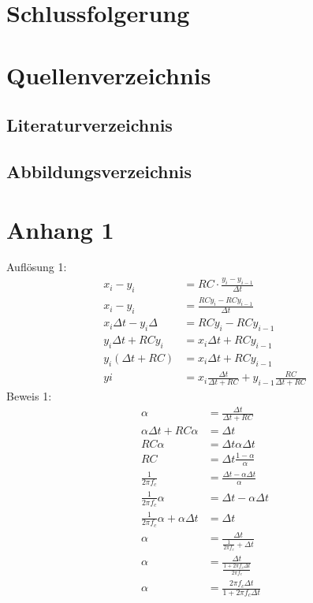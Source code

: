 \documentclass[12pt,a4paper, ngerman]{article}
\begin{document}
\section{Schlussfolgerung}

\newpage
\section{Quellenverzeichnis}
\subsection{Literaturverzeichnis}
\printbibliography
\subsection{Abbildungsverzeichnis}
\listoffigures
\newpage
\section{Anhang 1}
Auflösung 1:
\begin{align*} 
x_{i}-y_{i}&=RC\cdot \frac{y_{i}-y_{i-1}}{\Delta t} \\ 
x_{i}-y_{i}&=\frac{RCy_{i}-RCy_{i-1}}{\Delta t}\\
x_{i}\Delta t-y_{i}\Delta&=RCy_{i}-RCy_{i-1} \\
y_{i}\Delta t+RCy_{i}&=x_{i}\Delta t+RCy_{i-1} \\
y_{i}(\Delta t+RC)&=x_{i}\Delta t+RCy_{i-1} \\
y{i}&=x_{i}\frac{\Delta t}{\Delta t+RC} + y_{i-1}\frac{RC}{\Delta t+RC}
\end{align*}
Beweis 1:
\begin{align*}
\alpha&=\frac{\Delta t}{\Delta t+RC} \\
\alpha \Delta t+RC\alpha &= \Delta t \\
RC\alpha &= \Delta t \alpha \Delta t \\
RC &= \Delta t \frac{1-\alpha}{\alpha}\\
\frac{1}{2\pi f_{c}} &= \frac{\Delta t -\alpha\Delta t}{\alpha} \\
\frac{1}{2\pi f_{c}} \alpha &= \Delta t -\alpha\Delta t \\
\frac{1}{2\pi f_{c}} \alpha + \alpha\Delta t &= \Delta t \\
\alpha &= \frac{\Delta t}{\frac{1}{2\pi f_{c}} + \Delta t} \\
\alpha &= \frac{\Delta t}{\frac{1+2\pi f_{c}\Delta t}{2\pi f_{c}}} \\
\alpha &= \frac{2\pi f_{c}\Delta t}{1+2\pi f_{c}\Delta t} 
\end{align*}
\end{document}

